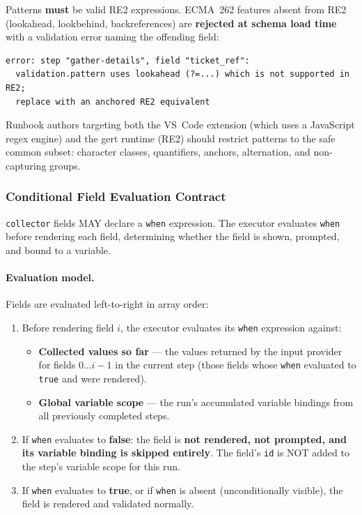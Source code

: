 Patterns \textbf{must} be valid RE2 expressions.  ECMA~262 features absent from RE2
(lookahead, lookbehind, backreferences) are \textbf{rejected at schema load time} with
a validation error naming the offending field:

\begin{verbatim}
error: step "gather-details", field "ticket_ref":
  validation.pattern uses lookahead (?=...) which is not supported in RE2;
  replace with an anchored RE2 equivalent
\end{verbatim}

Runbook authors targeting both the VS~Code extension (which uses a JavaScript regex
engine) and the gert runtime (RE2) should restrict patterns to the safe common subset:
character classes, quantifiers, anchors, alternation, and non-capturing groups.

\subsubsection*{Conditional Field Evaluation Contract}
\label{sec:conditional-field-eval}

\texttt{collector} fields MAY declare a \texttt{when} expression.  The executor
evaluates \texttt{when} before rendering each field, determining whether the field
is shown, prompted, and bound to a variable.

\paragraph{Evaluation model.}
Fields are evaluated left-to-right in array order:

\begin{enumerate}
  \item Before rendering field $i$, the executor evaluates its \texttt{when}
        expression against:
        \begin{itemize}
          \item \textbf{Collected values so far} — the values returned by the input
                provider for fields $0 \ldots i-1$ in the current step (those fields
                whose \texttt{when} evaluated to \texttt{true} and were rendered).
          \item \textbf{Global variable scope} — the run's accumulated variable
                bindings from all previously completed steps.
        \end{itemize}
  \item If \texttt{when} evaluates to \textbf{false}: the field is \textbf{not
        rendered, not prompted, and its variable binding is skipped entirely}.  The
        field's \texttt{id} is NOT added to the step's variable scope for this run.
  \item If \texttt{when} evaluates to \textbf{true}, or if \texttt{when} is absent
        (unconditionally visible), the field is rendered and validated normally.
\end{enumerate}

